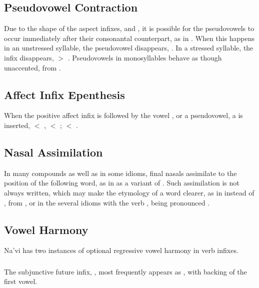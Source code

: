 \subsection{Pseudovowel Contraction} Due to the shape of the aspect
infixes,  and , it is possible for the
pseudovowels to occur immediately after their consonantal counterpart,
as in .  When this happens in an unstressed
syllable, the pseudovowel disappears, .  In a
stressed syllable, the infix disappears,  $>$
.  Pseudovowels in monosyllables behave as though
unaccented,  from . 

\subsection{Affect Infix Epenthesis} When the positive affect infix
 is followed by the vowel ,  or a pseudovowel, a
 is inserted,  $<$ ,  $<$
;  $<$ .
\label{l-and-s:eiy-epenth}

\subsection{Nasal Assimilation} In many compounds as well as in some
idioms, final nasals assimilate to the position of the following
word, as in  as a variant of .  Such assimilation is
not always written, which may make the etymology of a word clearer, as
in  instead of , from , or in the several
idioms with the verb  ,  being pronounced
.  \label{l-and-s:nasalassim}

\subsection{Vowel Harmony} Na'vi has two instances of optional
regressive vowel harmony in verb infixes.

\subsubsection{} The subjunctive future infix, , most
frequently appears as , with backing of the first vowel.

